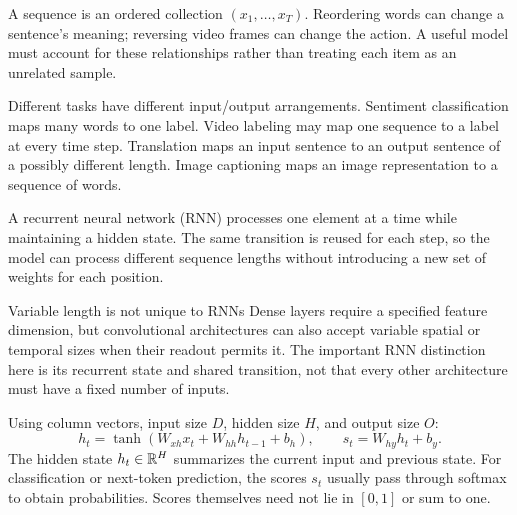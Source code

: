 \documentclass[11pt]{article}
\begin{document}
\tableofcontents\clearpage

A sequence is an ordered collection $(x_1,\ldots,x_T)$. Reordering words can change a sentence's meaning; reversing video frames can change the action. A useful model must account for these relationships rather than treating each item as an unrelated sample.

Different tasks have different input/output arrangements. Sentiment classification maps many words to one label. Video labeling may map one sequence to a label at every time step. Translation maps an input sentence to an output sentence of a possibly different length. Image captioning maps an image representation to a sequence of words.

A recurrent neural network (RNN) processes one element at a time while maintaining a hidden state. The same transition is reused for each step, so the model can process different sequence lengths without introducing a new set of weights for each position.
\begin{careful}{Variable length is not unique to RNNs}
Dense layers require a specified feature dimension, but convolutional architectures can also accept variable spatial or temporal sizes when their readout permits it. The important RNN distinction here is its recurrent state and shared transition, not that every other architecture must have a fixed number of inputs.
\end{careful}

Using column vectors, input size $D$, hidden size $H$, and output size $O$:
\[
h_t=\tanh(W_{xh}x_t+W_{hh}h_{t-1}+b_h),\qquad
s_t=W_{hy}h_t+b_y.
\]
The hidden state $h_t\in\mathbb{R}^H$ summarizes the current input and previous state. For classification or next-token prediction, the scores $s_t$ usually pass through softmax to obtain probabilities. Scores themselves need not lie in $[0,1]$ or sum to one.
\end{document}

